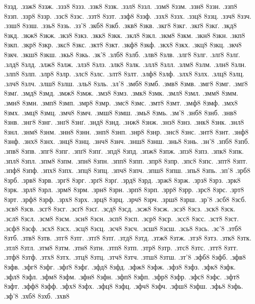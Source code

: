 {8ззд.
.ззж8
8ззж.
.ззз8
8ззз.
.ззк8
8ззк.
.ззл8
8ззл.
.ззм8
8ззм.
.ззн8
8ззн.
.ззп8
8ззп.
.ззр8
8ззр.
.ззс8
8ззс.
.ззт8
8ззт.
.ззф8
8ззф.
.ззх8
8ззх.
.ззц8
8ззц.
.ззч8
8ззч.
.ззш8
8ззш.
.ззь8
8ззь.
.зз'8
.зкб8
8зкб.
.зкв8
8зкв.
.зкг8
8зкг.
.зкґ8
8зкґ.
.зкд8
8зкд.
.зкж8
8зкж.
.зкз8
8зкз.
.зкк8
8зкк.
.зкл8
8зкл.
.зкм8
8зкм.
.зкн8
8зкн.
.зкп8
8зкп.
.зкр8
8зкр.
.зкс8
8зкс.
.зкт8
8зкт.
.зкф8
8зкф.
.зкх8
8зкх.
.зкц8
8зкц.
.зкч8
8зкч.
.зкш8
8зкш.
.зкь8
8зкь.
.зк'8
.злб8
8злб.
.злв8
8злв.
.злг8
8злг.
.злґ8
8злґ.
.злд8
8злд.
.злж8
8злж.
.злз8
8злз.
.злк8
8злк.
.злл8
8злл.
.злм8
8злм.
.злн8
8злн.
.злп8
8злп.
.злр8
8злр.
.злс8
8злс.
.злт8
8злт.
.злф8
8злф.
.злх8
8злх.
.злц8
8злц.
.злч8
8злч.
.злш8
8злш.
.зль8
8зль.
.зл'8
.змб8
8змб.
.змв8
8змв.
.змг8
8змг.
.змґ8
8змґ.
.змд8
8змд.
.змж8
8змж.
.змз8
8змз.
.змк8
8змк.
.змл8
8змл.
.змм8
8змм.
.змн8
8змн.
.змп8
8змп.
.змр8
8змр.
.змс8
8змс.
.змт8
8змт.
.змф8
8змф.
.змх8
8змх.
.змц8
8змц.
.змч8
8змч.
.змш8
8змш.
.змь8
8змь.
.зм'8
.знб8
8знб.
.знв8
8знв.
.знг8
8знг.
.знґ8
8знґ.
.знд8
8знд.
.знж8
8знж.
.знз8
8знз.
.знк8
8знк.
.знл8
8знл.
.знм8
8знм.
.знн8
8знн.
.знп8
8знп.
.знр8
8знр.
.знс8
8знс.
.знт8
8знт.
.знф8
8знф.
.знх8
8знх.
.знц8
8знц.
.знч8
8знч.
.знш8
8знш.
.знь8
8знь.
.зн'8
.зпб8
8зпб.
.зпв8
8зпв.
.зпг8
8зпг.
.зпґ8
8зпґ.
.зпд8
8зпд.
.зпж8
8зпж.
.зпз8
8зпз.
.зпк8
8зпк.
.зпл8
8зпл.
.зпм8
8зпм.
.зпн8
8зпн.
.зпп8
8зпп.
.зпр8
8зпр.
.зпс8
8зпс.
.зпт8
8зпт.
.зпф8
8зпф.
.зпх8
8зпх.
.зпц8
8зпц.
.зпч8
8зпч.
.зпш8
8зпш.
.зпь8
8зпь.
.зп'8
.зрб8
8зрб.
.зрв8
8зрв.
.зрг8
8зрг.
.зрґ8
8зрґ.
.зрд8
8зрд.
.зрж8
8зрж.
.зрз8
8зрз.
.зрк8
8зрк.
.зрл8
8зрл.
.зрм8
8зрм.
.зрн8
8зрн.
.зрп8
8зрп.
.зрр8
8зрр.
.зрс8
8зрс.
.зрт8
8зрт.
.зрф8
8зрф.
.зрх8
8зрх.
.зрц8
8зрц.
.зрч8
8зрч.
.зрш8
8зрш.
.зр'8
.зсб8
8зсб.
.зсв8
8зсв.
.зсг8
8зсг.
.зсґ8
8зсґ.
.зсд8
8зсд.
.зсж8
8зсж.
.зсз8
8зсз.
.зск8
8зск.
.зсл8
8зсл.
.зсм8
8зсм.
.зсн8
8зсн.
.зсп8
8зсп.
.зср8
8зср.
.зсс8
8зсс.
.зст8
8зст.
.зсф8
8зсф.
.зсх8
8зсх.
.зсц8
8зсц.
.зсч8
8зсч.
.зсш8
8зсш.
.зсь8
8зсь.
.зс'8
.зтб8
8зтб.
.зтв8
8зтв.
.зтг8
8зтг.
.зтґ8
8зтґ.
.зтд8
8зтд.
.зтж8
8зтж.
.зтз8
8зтз.
.зтк8
8зтк.
.зтл8
8зтл.
.зтм8
8зтм.
.зтн8
8зтн.
.зтп8
8зтп.
.зтр8
8зтр.
.зтс8
8зтс.
.зтт8
8зтт.
.зтф8
8зтф.
.зтх8
8зтх.
.зтц8
8зтц.
.зтч8
8зтч.
.зтш8
8зтш.
.зт'8
.зфб8
8зфб.
.зфв8
8зфв.
.зфг8
8зфг.
.зфґ8
8зфґ.
.зфд8
8зфд.
.зфж8
8зфж.
.зфз8
8зфз.
.зфк8
8зфк.
.зфл8
8зфл.
.зфм8
8зфм.
.зфн8
8зфн.
.зфп8
8зфп.
.зфр8
8зфр.
.зфс8
8зфс.
.зфт8
8зфт.
.зфф8
8зфф.
.зфх8
8зфх.
.зфц8
8зфц.
.зфч8
8зфч.
.зфш8
8зфш.
.зфь8
8зфь.
.зф'8
.зхб8
8зхб.
.зхв8
}
